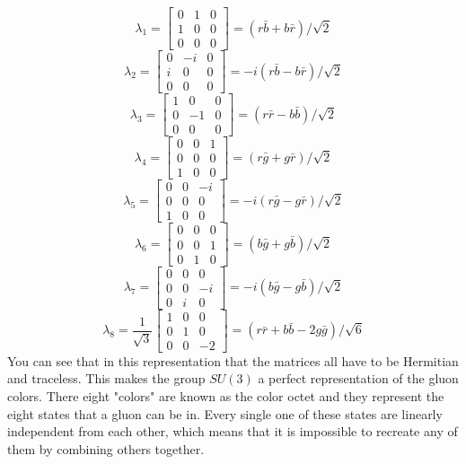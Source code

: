 \documentclass[12pt,journal,compsoc]{IEEEtran}
\begin{document}
\[
\lambda_1 = \left[ \begin{matrix}
	0 & 1 & 0\\
	1 & 0 & 0\\
	0 & 0 & 0
	\end{matrix} \right] = (r\bar{b} + b\bar{r})/\sqrt{2}
\]\[
\lambda_2 = \left[ \begin{matrix}
	0 & -i & 0\\
	i & 0 & 0\\
	0 & 0 & 0
	\end{matrix} \right] = -i(r\bar{b} - b\bar{r})/\sqrt{2}
\]\[
\lambda_3 = \left[ \begin{matrix}
	1 & 0 & 0\\
	0 & -1 & 0\\
	0 & 0 & 0
	\end{matrix} \right] = (r\bar{r} - b\bar{b})/\sqrt{2}
\]\[
\lambda_4 = \left[ \begin{matrix}
	0 & 0 & 1\\
	0 & 0 & 0\\
	1 & 0 & 0
	\end{matrix} \right] = (r\bar{g} + g\bar{r})/\sqrt{2}
\]\[
\lambda_5 = \left[ \begin{matrix}
	0 & 0 & -i\\
	0 & 0 & 0\\
	1 & 0 & 0
	\end{matrix} \right] = -i(r\bar{g} - g\bar{r})/\sqrt{2}
\]\[
\lambda_6 = \left[ \begin{matrix}
	0 & 0 & 0\\
	0 & 0 & 1\\
	0 & 1 & 0
	\end{matrix} \right] = (b\bar{g} + g\bar{b})/\sqrt{2}
\]\[
\lambda_7 = \left[ \begin{matrix}
	0 & 0 & 0\\
	0 & 0 & -i\\
	0 & i & 0
	\end{matrix} \right] = -i(b\bar{g} - g\bar{b})/\sqrt{2}
\]\[
\lambda_8 = \frac{1}{\sqrt{3}}\left[ \begin{matrix}
	1 & 0 & 0\\
	0 & 1 & 0\\
	0 & 0 & -2
	\end{matrix} \right] = (r\bar{r} + b\bar{b} - 2g\bar{g})/\sqrt{6}
\]
You can see that in this representation that the matrices all have to be Hermitian and traceless. This makes the group $SU(3)$ a perfect representation of the gluon colors. There eight "colors" are known as the color octet and they represent the eight states that a gluon can be in. Every single one of these states are linearly independent from each other, which means that it is impossible to recreate any of them by combining others together.
\end{document}
